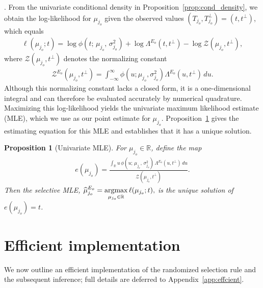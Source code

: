 \documentclass[12pt]{article}
\newcommand{\nbracket}[1]{\left( #1 \right)}
\newtheorem{proposition}{Proposition}[section]
\def\argmax{\mathop{\rm argmax}\limits}
\newcommand{\real}{\mathbb{R}}
\begin{document}
. \quad From the univariate conditional density in Proposition~\ref{prop:cond_density}, we obtain the log-likelihood for $\mu_{j_o}$ given the observed values $(T_{j_o}, T_{j_o}^\perp)=(t,t^\perp)$, which equals
\begin{align}
  \label{eq:sel_loglik}
  \ell(\mu_{j_o}; t)
  = \log \phi\nbracket{t;\, \mu_{j_o},\, \sigma_{j_o}^2}
   + \log \Lambda^{E_o}\nbracket{t, t^\perp}
   - \log \mathcal{Z}(\mu_{j_o}, t^\perp),
\end{align} where  $\mathcal{Z}(\mu_{j_o}, t^\perp)$ denotes the  normalizing constant 
\begin{align}
\label{eq:norm_const}
  \mathcal{Z}^{E_o}(\mu_{j_o},t^\perp)
  =
  \int_{-\infty}^{\infty}
  \phi(u;\mu_{j_o},\sigma_{j_o}^2)
  \Lambda^{E_o}(u,t^\perp)
  \,du.
\end{align}
Although this normalizing constant lacks a closed form, it is a one-dimensional integral and can therefore be evaluated accurately by numerical quadrature.
Maximizing this log-likelihood yields the univariate maximum likelihood estimate (MLE), which we use as our point estimate for $\mu_{j_o}$.
Proposition~\ref{prop:smle} gives the estimating equation for this MLE and establishes that it has a unique solution.

\begin{proposition}[Univariate MLE]
\label{prop:smle}
For $\mu_{j_o}\in \real$, define the map
\begin{align*}
  e(\mu_{j_o})
  = \frac{
       \int_{\real} u\, \phi\nbracket{u;\, \mu_{j_o},\, \sigma_{j_o}^2}\,
       \Lambda^{E_o}\nbracket{u, t^\perp}\, du
     }{
       \mathcal{Z}(\mu_{j_o}, t^\perp)
     }.
\end{align*}
Then the selective MLE, 
$\widehat{\mu}_{j_o}^{E_o}
   = \argmax_{\mu_{j_o} \in \real} \ell(\mu_{j_o}; t),$ is the unique solution of $e(\mu_{j_o}) = t$.
\end{proposition}


\section{Efficient implementation}
\label{sec:efficient}
We now outline an efficient implementation of the randomized selection rule and the subsequent inference; full details are deferred to Appendix~\ref{app:effcient}.
\end{document}
